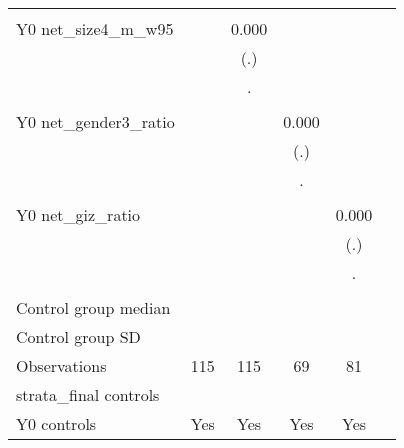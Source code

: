 \begin{table}[!h]
\begin{adjustbox}{width=\columnwidth,center}
\begin{tabular}{l*{5}{c}}
                    &                     &                     &                     &                     \\
Y0 net\_size4\_m\_w95  &                     &       0.000         &                     &                     \\
                    &                     &         (.)         &                     &                     \\
                    &                     &           .         &                     &                     \\
                    &                     &                     &                     &                     \\
Y0 net\_gender3\_ratio&                     &                     &       0.000         &                     \\
                    &                     &                     &         (.)         &                     \\
                    &                     &                     &           .         &                     \\
                    &                     &                     &                     &                     \\
Y0 net\_giz\_ratio    &                     &                     &                     &       0.000         \\
                    &                     &                     &                     &         (.)         \\
                    &                     &                     &                     &           .         \\
                    &                     &                     &                     &                     \\
\hline
Control group median&                     &                     &                     &                     \\
Control group SD    &                     &                     &                     &                     \\
Observations        &         115         &         115         &          69         &          81         \\
strata\_final controls&                     &                     &                     &                     \\
Y0 controls         &         Yes         &         Yes         &         Yes         &         Yes         \\

\end{tabular}
\end{adjustbox}
\end{table}
